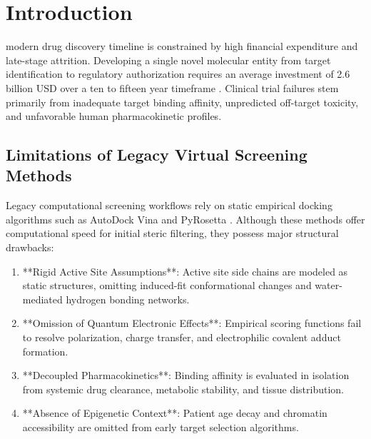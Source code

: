 \documentclass[10pt,journal,compsoc]{IEEEtran}
\begin{document}
\maketitle
\IEEEdisplaynontitleabstractindextext
\IEEEpeerreviewmaketitle

\section{Introduction}
 modern drug discovery timeline is constrained by high financial expenditure and late-stage attrition. Developing a single novel molecular entity from target identification to regulatory authorization requires an average investment of 2.6 billion USD over a ten to fifteen year timeframe \cite{diMasi2016}. Clinical trial failures stem primarily from inadequate target binding affinity, unpredicted off-target toxicity, and unfavorable human pharmacokinetic profiles.

\subsection{Limitations of Legacy Virtual Screening Methods}
Legacy computational screening workflows rely on static empirical docking algorithms such as AutoDock Vina \cite{trott2010} and PyRosetta \cite{chaudhury2011}. Although these methods offer computational speed for initial steric filtering, they possess major structural drawbacks:
\begin{enumerate}
    \item **Rigid Active Site Assumptions**: Active site side chains are modeled as static structures, omitting induced-fit conformational changes and water-mediated hydrogen bonding networks.
    \item **Omission of Quantum Electronic Effects**: Empirical scoring functions fail to resolve polarization, charge transfer, and electrophilic covalent adduct formation.
    \item **Decoupled Pharmacokinetics**: Binding affinity is evaluated in isolation from systemic drug clearance, metabolic stability, and tissue distribution.
    \item **Absence of Epigenetic Context**: Patient age decay and chromatin accessibility are omitted from early target selection algorithms.
\end{enumerate}
\end{document}
